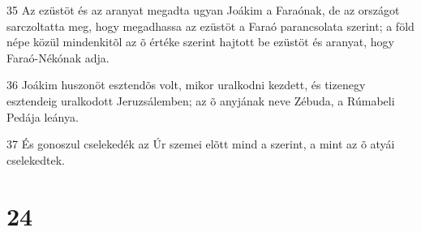 \par 35 Az ezüstöt és az aranyat megadta ugyan Joákim a Faraónak, de az országot sarczoltatta meg, hogy megadhassa az ezüstöt a Faraó parancsolata szerint; a föld népe közül mindenkitõl az õ értéke szerint hajtott be ezüstöt és aranyat, hogy Faraó-Nékónak adja.
\par 36 Joákim huszonöt esztendõs volt, mikor uralkodni kezdett, és tizenegy esztendeig uralkodott Jeruzsálemben; az õ anyjának neve Zébuda, a Rúmabeli Pedája leánya.
\par 37 És gonoszul cselekedék az Úr szemei elõtt mind a szerint, a mint az õ atyái cselekedtek.

\chapter{24}

